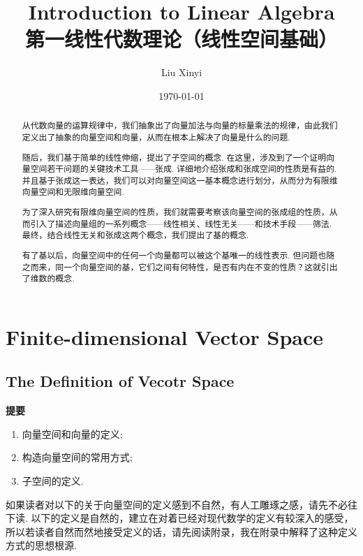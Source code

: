 \documentclass{ctexart}
\title{Introduction to Linear Algebra\\ 第一线性代数理论（线性空间基础）}
\author{Liu Xinyi}
\date{\today}
\begin{document}
\maketitle
\begin{abstract}
    从代数向量的运算规律中，我们抽象出了向量加法与向量的标量乘法的规律，由此我们定义出了抽象的向量空间和向量，从而在根本上解决了向量是什么的问题.

    随后，我们基于简单的线性伸缩，提出了子空间的概念. 在这里，涉及到了一个证明向量空间若干问题的关键技术工具——张成. 详细地介绍张成和张成空间的性质是有益的. 并且基于张成这一表达，我们可以对向量空间这一基本概念进行划分，从而分为有限维向量空间和无限维向量空间.

    为了深入研究有限维向量空间的性质，我们就需要考察该向量空间的张成组的性质，从而引入了描述向量组的一系列概念——线性相关、线性无关——和技术手段——筛法. 最终，结合线性无关和张成这两个概念，我们提出了基的概念. 

    有了基以后，向量空间中的任何一个向量都可以被这个基唯一的线性表示. 但问题也随之而来，同一个向量空间的基，它们之间有何特性，是否有内在不变的性质？这就引出了维数的概念. 
\end{abstract}
\newpage

\section{Finite-dimensional Vector Space}

\subsection{The Definition of Vecotr Space}

\textbf{提要}
\begin{enumerate}
    \item 向量空间和向量的定义;
    \item 构造向量空间的常用方式;
    \item 子空间的定义.
\end{enumerate}



\noindent 如果读者对以下的关于向量空间的定义感到不自然，有人工雕琢之感，请先不必往下读. 以下的定义是自然的，建立在对着已经对现代数学的定义有较深入的感受，所以若读者自然而然地接受定义的话，请先阅读附录，我在附录中解释了这种定义方式的思想根源.\\
\end{document}
